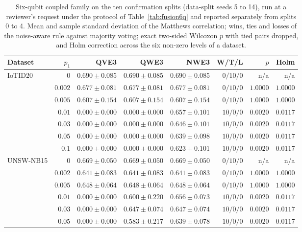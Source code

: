 \begin{table}[t]
\centering
\caption{Six-qubit coupled family on the ten confirmation splits (data-split seeds 5 to
14), run at a reviewer's request under the protocol of Table~\ref{tab:fusion6q} and
reported separately from splits 0 to 4. Mean and sample standard deviation of the Matthews
correlation; wins, ties and losses of the noise-aware rule against majority voting; exact
two-sided Wilcoxon $p$ with tied pairs dropped, and Holm correction across the six
non-zero levels of a dataset.}
\label{tab:s1splits}
\footnotesize
\setlength{\tabcolsep}{3pt}
\begin{tabular}{@{}lrrrrrrr@{}}
\toprule
Dataset & $p_1$ & QVE3 & QWE3 & NWE3 & W/T/L & $p$ & Holm \\
\midrule
\multirow{7}{*}{IoTID20}
 & $0$ & $0.690 \pm 0.085$ & $0.690 \pm 0.085$ & $0.690 \pm 0.085$ & $0/10/0$ & n/a & n/a \\
 & $0.002$ & $0.677 \pm 0.081$ & $0.677 \pm 0.081$ & $0.677 \pm 0.081$ & $0/10/0$ & $1.0000$ & $1.0000$ \\
 & $0.005$ & $0.607 \pm 0.154$ & $0.607 \pm 0.154$ & $0.607 \pm 0.154$ & $0/10/0$ & $1.0000$ & $1.0000$ \\
 & $0.01$ & $0.000 \pm 0.000$ & $0.000 \pm 0.000$ & $0.657 \pm 0.101$ & $10/0/0$ & $0.0020$ & $0.0117$ \\
 & $0.03$ & $0.000 \pm 0.000$ & $0.000 \pm 0.000$ & $0.646 \pm 0.101$ & $10/0/0$ & $0.0020$ & $0.0117$ \\
 & $0.05$ & $0.000 \pm 0.000$ & $0.000 \pm 0.000$ & $0.639 \pm 0.098$ & $10/0/0$ & $0.0020$ & $0.0117$ \\
 & $0.1$ & $0.000 \pm 0.000$ & $0.000 \pm 0.000$ & $0.623 \pm 0.101$ & $10/0/0$ & $0.0020$ & $0.0117$ \\
\midrule
\multirow{7}{*}{UNSW-NB15}
 & $0$ & $0.669 \pm 0.050$ & $0.669 \pm 0.050$ & $0.669 \pm 0.050$ & $0/10/0$ & n/a & n/a \\
 & $0.002$ & $0.641 \pm 0.083$ & $0.641 \pm 0.083$ & $0.641 \pm 0.083$ & $0/10/0$ & $1.0000$ & $1.0000$ \\
 & $0.005$ & $0.648 \pm 0.064$ & $0.648 \pm 0.064$ & $0.648 \pm 0.064$ & $0/10/0$ & $1.0000$ & $1.0000$ \\
 & $0.01$ & $0.000 \pm 0.000$ & $0.600 \pm 0.220$ & $0.656 \pm 0.073$ & $10/0/0$ & $0.0020$ & $0.0117$ \\
 & $0.03$ & $0.000 \pm 0.000$ & $0.647 \pm 0.074$ & $0.647 \pm 0.074$ & $10/0/0$ & $0.0020$ & $0.0117$ \\
 & $0.05$ & $0.000 \pm 0.000$ & $0.583 \pm 0.217$ & $0.639 \pm 0.078$ & $10/0/0$ & $0.0020$ & $0.0117$ \\

\end{tabular}
\end{table}
